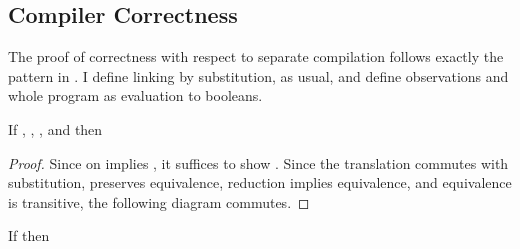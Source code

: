 \subsection{Compiler Correctness}
The proof of correctness with respect to separate compilation follows exactly
the pattern in .
I define linking by substitution, as usual, and define observations and whole
program as evaluation to booleans.
\begin{theorem}
  \label{thm:cc:comp-correct}
  If \im{\wf{\slenv}{\se}},
  \im{\wf{\slenv}{\ssubst}},
  \im{\wf{\cctrans{\slenv}}{\pccsubst}},
  and \im{\cctrans{\ssubst} \equiv \pccsubst}
  then
  \im{\seval{\ssubst(\se)} \approx \teval{\pccsubst(\cctrans{\se})}}
\end{theorem}
\begin{proof}
  Since \im{\equiv} on  implies \im{\approx}, it suffices to show
  \im{\seval{\ssubst(\se)} \equiv \teval{\pccsubst(\cctrans{\se})}}.
  Since the translation commutes with substitution, preserves equivalence, reduction implies
  equivalence, and equivalence is transitive, the following diagram commutes.

  \vtop{%
    \begin{tikzcd}
    \cctrans{(\ssubst(\se))} \arrow[r, "\equiv"] \arrow[d, "\equiv"]
    & \pccsubst(\cctrans{\se}) \arrow[d, "\equiv"] \\
      \cctrans{\sv} \arrow[r, "\equiv"]
      & \pccvpr
  \end{tikzcd}}\qedhere
\end{proof}

\begin{corollary}
  If \im{\wf{\cdot}{\se}}
  then \im{\seval{\se} \approx \teval{\cctrans{\se}}}
\end{corollary}
